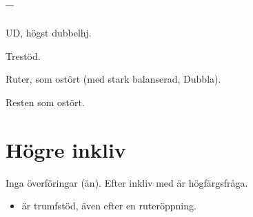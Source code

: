 \subsection{--}

\bbe
\item[D] UD, högst dubbelhj.
\item[\NT{1}] Trestöd.
\item[\kl{2}] Ruter, som ostört (med stark balanserad, Dubbla).
\ebe

Resten som ostört.

\section{Högre inkliv}

Inga överföringar (än). Efter inkliv med  är  högfärgsfråga.

\begin{itemize}

\item {} är trumfstöd, även efter en ruteröppning.


\end{itemize}









